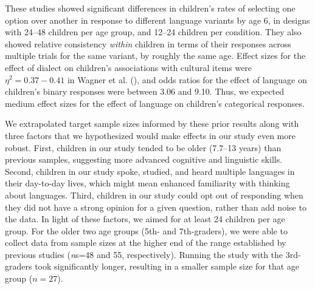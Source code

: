 \documentclass[11pt, floatsintext]{article}
\begin{document}
These studies showed significant differences in children's rates of selecting one option over another in response to different language variants by age 6, in designs with 24--48 children per age group, and 12--24 children per condition. 
They also showed relative consistency \textit{within} children in terms of their responses across multiple trials for the same variant, by roughly the same age. Effect sizes for the effect of dialect on children's associations with cultural items were $\eta^{2}=0.37-0.41$ in Wagner et al. (\citeyear{wagner2014children}), and odds ratios for the effect of language on children's binary responses were between 3.06 and 9.10. 
Thus, we expected medium effect sizes for the effect of language on children's categorical responses. 

We extrapolated target sample sizes informed by these prior results along with %
three factors that we hypothesized would make effects in our study even more robust. 
First, children in our study tended to be older (7.7--13 years) than previous samples, suggesting more advanced cognitive and linguistic skills. 
Second, children in our study spoke, studied, and heard multiple languages in their day-to-day lives, which might mean enhanced familiarity with thinking about languages. 
Third, children in our study could opt out of responding when they did not have a strong opinion for a given question, rather than add noise to the data. 
In light of these factors, we aimed for at least 24 children per age group. 
For the older two age groups (5th- and 7th-graders), we were able to collect data from sample sizes at the higher end of the range established by previous studies (\textit{n}s=48 and 55, respectively). 
Running the study with the 3rd-graders took significantly longer, resulting in a smaller sample size for that age group ($n=27$). 






\end{document}
